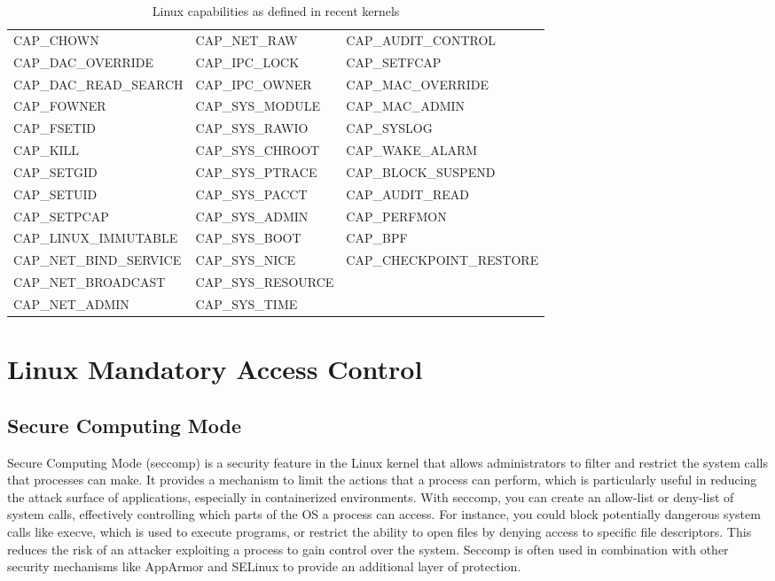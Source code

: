 \begin{doublespace}
\begin{table}[H]
  \centering
  \caption{Linux capabilities as defined in recent kernels \cite{kerrisk2025capabilities}}
  \label{table:linux-capabilities}
  \footnotesize
  \begin{tabular}{|l|l|l|}
    \hline
    CAP_CHOWN & CAP_NET_RAW & CAP_AUDIT_CONTROL \\
    CAP_DAC_OVERRIDE & CAP_IPC_LOCK & CAP_SETFCAP \\
    CAP_DAC_READ_SEARCH & CAP_IPC_OWNER & CAP_MAC_OVERRIDE \\
    CAP_FOWNER & CAP_SYS_MODULE & CAP_MAC_ADMIN \\
    CAP_FSETID & CAP_SYS_RAWIO & CAP_SYSLOG \\
    CAP_KILL & CAP_SYS_CHROOT & CAP_WAKE_ALARM \\
    CAP_SETGID & CAP_SYS_PTRACE & CAP_BLOCK_SUSPEND \\
    CAP_SETUID & CAP_SYS_PACCT & CAP_AUDIT_READ \\
    CAP_SETPCAP & CAP_SYS_ADMIN & CAP_PERFMON \\
    CAP_LINUX_IMMUTABLE & CAP_SYS_BOOT & CAP_BPF \\
    CAP_NET_BIND_SERVICE & CAP_SYS_NICE & CAP_CHECKPOINT_RESTORE \\
    CAP_NET_BROADCAST & CAP_SYS_RESOURCE & \\
    CAP_NET_ADMIN & CAP_SYS_TIME & \\
    \hline
  \end{tabular}
\end{table}


\section{Linux Mandatory Access Control}

\subsection{Secure Computing Mode}
Secure Computing Mode (seccomp) is a security feature in the Linux kernel that allows administrators to filter and restrict the system calls that processes can make. It provides a mechanism to limit the actions that a process can perform, which is particularly useful in reducing the attack surface of applications, especially in containerized environments. With seccomp, you can create an allow-list or deny-list of system calls, effectively controlling which parts of the OS a process can access. For instance, you could block potentially dangerous system calls like execve, which is used to execute programs, or restrict the ability to open files by denying access to specific file descriptors. This reduces the risk of an attacker exploiting a process to gain control over the system. Seccomp is often used in combination with other security mechanisms like AppArmor and SELinux to provide an additional layer of protection.


\end{doublespace}
